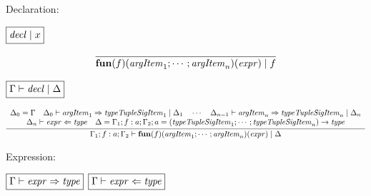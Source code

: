 Declaration:

$\fbox{$\mathit{decl} \mid x$}$

\begin{gather*}
  \infer{\mathbf{fun}(f)(\mathit{argItem}_1; \cdots; \mathit{argItem}_n)(\mathit{expr}) \mid f}{}
\end{gather*}

$\fbox{$\Gamma \vdash \mathit{decl} \mid \Delta$}$

\begin{gather*}
  \infer{\Gamma_1; f: a; \Gamma_2 \vdash \mathbf{fun}(f)(\mathit{argItem}_1; \cdots; \mathit{argItem}_n)(\mathit{expr}) \mid \Delta}{
    \begin{array}{c}
      \Delta_0 = \Gamma
      \hspace{1em}
      \Delta_0 \vdash \mathit{argItem}_1 \Rightarrow \mathit{typeTupleSigItem}_1 \mid \Delta_1
      \hspace{1em}
      \cdots
      \hspace{1em}
      \Delta_{n - 1} \vdash \mathit{argItem}_n \Rightarrow \mathit{typeTupleSigItem}_n \mid \Delta_n
      \\
      \Delta_n \vdash \mathit{expr} \Leftarrow \mathit{type}
      \hspace{1em}
      \Delta = \Gamma_1; f: a; \Gamma_2; a = (\mathit{typeTupleSigItem}_1; \cdots; \mathit{typeTupleSigItem}_n) \rightarrow \mathit{type}
    \end{array}
  }
\end{gather*}

Expression:

$\fbox{$\Gamma \vdash \mathit{expr} \Rightarrow \mathit{type}$}$
$\fbox{$\Gamma \vdash \mathit{expr} \Leftarrow \mathit{type}$}$

